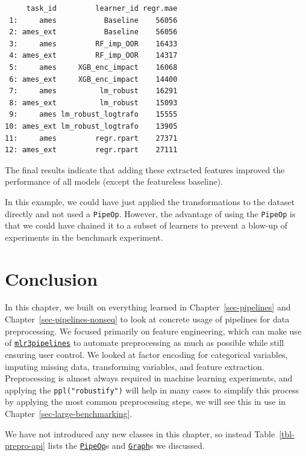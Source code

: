 \begin{verbatim}
     task_id         learner_id regr.mae
 1:     ames           Baseline    56056
 2: ames_ext           Baseline    56056
 3:     ames         RF_imp_OOR    16433
 4: ames_ext         RF_imp_OOR    14317
 5:     ames     XGB_enc_impact    16068
 6: ames_ext     XGB_enc_impact    14400
 7:     ames          lm_robust    16291
 8: ames_ext          lm_robust    15093
 9:     ames lm_robust_logtrafo    15555
10: ames_ext lm_robust_logtrafo    13905
11:     ames         regr.rpart    27371
12: ames_ext         regr.rpart    27111
\end{verbatim}

The final results indicate that adding these extracted features improved
the performance of all models (except the featureless baseline).

In this example, we could have just applied the transformations to the
dataset directly and not used a \texttt{PipeOp}. However, the advantage
of using the \texttt{PipeOp} is that we could have chained it to a
subset of learners to prevent a blow-up of experiments in the benchmark
experiment.

\hypertarget{conclusion-7}{%
\section{Conclusion}\label{conclusion-7}}

In this chapter, we built on everything learned in
Chapter~\ref{sec-pipelines} and Chapter~\ref{sec-pipelines-nonseq} to
look at concrete usage of pipelines for data preprocessing. We focused
primarily on feature engineering, which can make use of
\href{https://mlr3pipelines.mlr-org.com}{\texttt{mlr3pipelines}}
to automate preprocessing as much as possible while still ensuring user
control. We looked at factor encoding for categorical variables,
imputing missing data, transforming variables, and feature extraction.
Preprocessing is almost always required in machine learning experiments,
and applying the \texttt{ppl("robustify")} will help in many cases to
simplify this process by applying the most common preprocessing steps,
we will see this in use in Chapter~\ref{sec-large-benchmarking}.

We have not introduced any new classes in this chapter, so instead
Table~\ref{tbl-prepro-api} lists the
\href{https://mlr3pipelines.mlr-org.com/reference/PipeOp.html}{\texttt{PipeOp}}s
and
\href{https://mlr3pipelines.mlr-org.com/reference/Graph.html}{\texttt{Graph}}s
we discussed.

